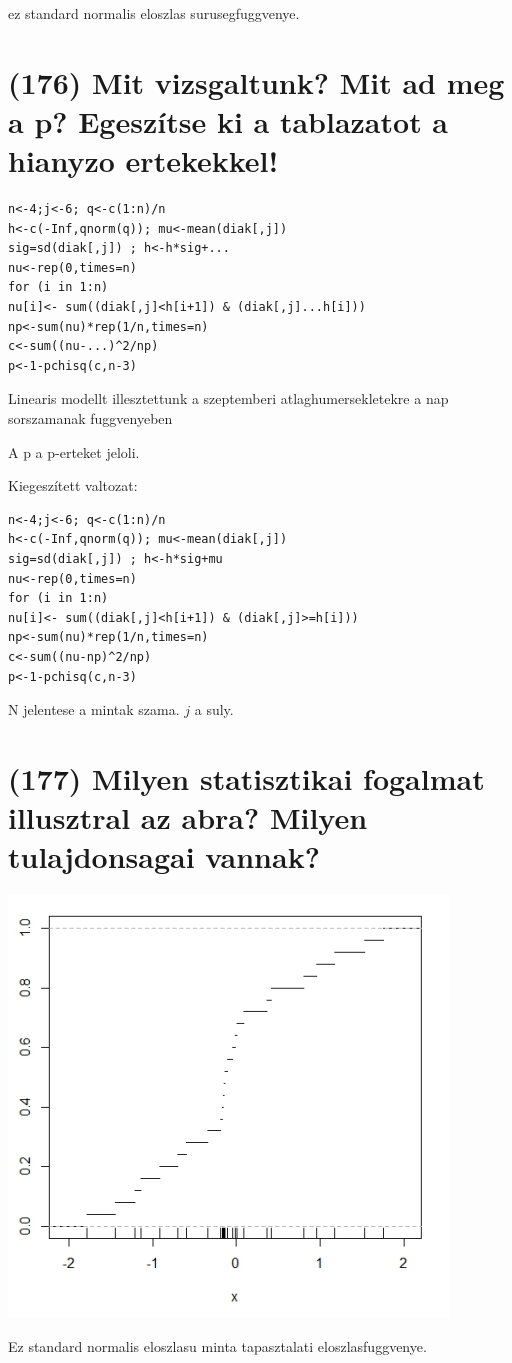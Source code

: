 \documentclass[12p]{article}
\begin{document}
ez standard normalis eloszlas surusegfuggvenye.


\section{(176) Mit vizsgaltunk? Mit ad meg a p? Egeszítse ki a tablazatot a hianyzo ertekekkel!}

\begin{verbatim}
n<-4;j<-6; q<-c(1:n)/n
h<-c(-Inf,qnorm(q)); mu<-mean(diak[,j])
sig=sd(diak[,j]) ; h<-h*sig+...
nu<-rep(0,times=n)
for (i in 1:n)
nu[i]<- sum((diak[,j]<h[i+1]) & (diak[,j]...h[i]))
np<-sum(nu)*rep(1/n,times=n)
c<-sum((nu-...)^2/np)
p<-1-pchisq(c,n-3)
\end{verbatim}

Linearis modellt illesztettunk a
szeptemberi atlaghumersekletekre a nap sorszamanak fuggvenyeben

A p a p-erteket jeloli.

Kiegeszített valtozat:

\begin{verbatim}
n<-4;j<-6; q<-c(1:n)/n
h<-c(-Inf,qnorm(q)); mu<-mean(diak[,j])
sig=sd(diak[,j]) ; h<-h*sig+mu
nu<-rep(0,times=n)
for (i in 1:n)
nu[i]<- sum((diak[,j]<h[i+1]) & (diak[,j]>=h[i]))
np<-sum(nu)*rep(1/n,times=n)
c<-sum((nu-np)^2/np)
p<-1-pchisq(c,n-3)
\end{verbatim}

N jelentese a mintak szama. $j$ a suly.


\section{(177) Milyen statisztikai fogalmat illusztral az abra? Milyen tulajdonsagai vannak?}

\includegraphics[scale=1.0]{gorbe2}

Ez standard normalis eloszlasu minta tapasztalati eloszlasfuggvenye.
\end{document}
